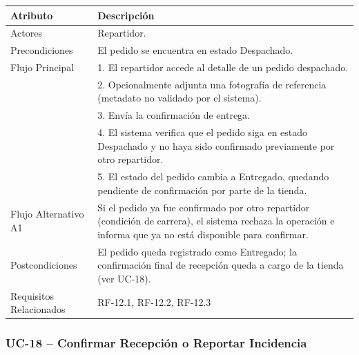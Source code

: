 \documentclass[12pt,a4paper]{report}
\begin{document}
\begin{longtable}{|p{4cm}|p{10cm}|}
\hline
\textbf{Atributo} & \textbf{Descripción} \\ \hline
Actores & Repartidor. \\ \hline
Precondiciones & El pedido se encuentra en estado Despachado. \\ \hline
Flujo Principal &
1. El repartidor accede al detalle de un pedido despachado.\\
& 2. Opcionalmente adjunta una fotografía de referencia (metadato no validado por el sistema).\\
& 3. Envía la confirmación de entrega.\\
& 4. El sistema verifica que el pedido siga en estado Despachado y no haya sido confirmado previamente por otro repartidor.\\
& 5. El estado del pedido cambia a Entregado, quedando pendiente de confirmación por parte de la tienda. \\ \hline
Flujo Alternativo A1 & Si el pedido ya fue confirmado por otro repartidor (condición de carrera), el sistema rechaza la operación e informa que ya no está disponible para confirmar. \\ \hline
Postcondiciones & El pedido queda registrado como Entregado; la confirmación final de recepción queda a cargo de la tienda (ver UC-18). \\ \hline
Requisitos Relacionados & RF-12.1, RF-12.2, RF-12.3 \\ \hline
\end{longtable}

\subsubsection{UC-18 -- Confirmar Recepción o Reportar Incidencia}
\end{document}

